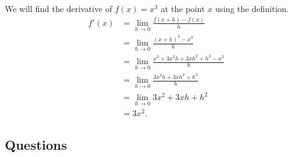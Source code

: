 \begin{ex}
  We will find the derivative of $ f(x) = x^3 $ at the point $ x $ using the definition.
  \begin{align*}
    f'(x) &= \lim_{h \to 0} \frac{f(x + h) - f(x)}{h}\\
          &= \lim_{h \to 0} \frac{(x + h)^3 - x^3}{h}\\
          &= \lim_{h \to 0} \frac{x^3 + 3x^2h + 3xh^2 + h^3 - x^3}{h}\\
          &= \lim_{h \to 0} \frac{3x^2 h + 3xh^2 + h^3}{h}\\
          &= \lim_{h \to 0} 3x^2 + 3xh + h^2\\
          &= 3x^2.
  \end{align*}
\end{ex}

\clearpage
\subsection*{Questions}

